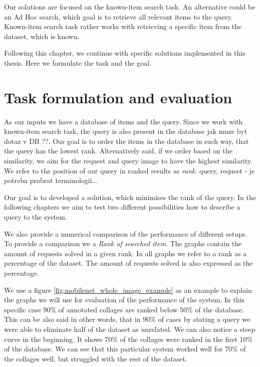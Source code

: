 Our solutions are focused on the known-item search task. An alternative could be an Ad Hoc search, which goal is to retrieve all relevant items to the query. Known-item search task rather works with retrieving a specific item from the dataset, which is known.

Following this chapter, we continue with specific solutions implemented in this thesis. Here we formulate the task and the goal.

\section*{Task formulation and evaluation}

As our inputs we have a database of items and the query. Since we work with known-item search task, the query is also present in the database {\color{red} jak muze byt dotaz v DB ??}. Our goal is to order the items in the database in such way, that the query has the lowest rank. Alternatively said, if we order based on the similarity, we aim for the request and query image to have the highest similarity. We refer to the position of our query in ranked results as \emph{rank}. {\color{red} query, request - je potreba probrat terminologii...}

Our goal is to developed a solution, which minimises the rank of the query. In the following chapters we aim to test two different possibilities how to describe a query to the system.

We also provide a numerical comparison of the performance of different setups. To provide a comparison we a \emph{Rank of searched item}. The graphs contain the amount of requests solved in a given rank. In all graphs we refer to a rank as a percentage of the dataset. The amount of requests solved is also expressed as the percentage.

We use a figure \ref{fig:mobilenet_whole_image_example} as an example to explain the graphs we will use for evaluation of the performance of the system. In this specific case 90\% of annotated collages are ranked below 50\% of the database. This can be also said in other words, that in 90\% of cases by stating a query we were able to eliminate half of the dataset as unrelated. We can also notice a steep curve in the beginning. It shows 70\% of the collages were ranked in the first 10\% of the database. We can see that this particular system worked well for 70\% of the collages well, but struggled with the rest of the dataset.

